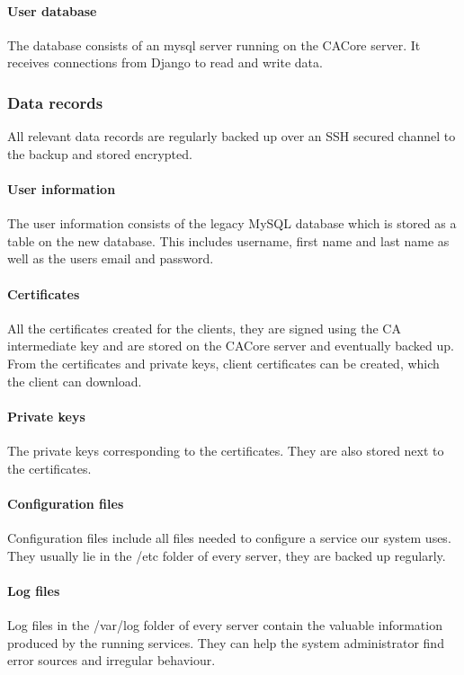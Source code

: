 \documentclass[english]{article}
\begin{document}
\paragraph{User database}
The database consists of an mysql server running on the CACore server. It receives connections from Django to read and write data.

\subsubsection{Data records}

All relevant data records are regularly backed up over an SSH secured channel to the backup and stored encrypted.

\paragraph{User information}
The user information consists of the legacy MySQL database which is stored as a table on the new database. This includes username, first name and last name as well as the users email and password.

\paragraph{Certificates}
All the certificates created for the clients, they are signed using the CA intermediate key and are stored on the CACore server and eventually backed up. From the certificates and private keys, client certificates can be created, which the client can download.


\paragraph{Private keys}
The private keys corresponding to the certificates. They are also stored next to the certificates.

\paragraph{Configuration files}
Configuration files include all files needed to configure a service our system uses. They usually lie in the /etc folder of every server, they are backed up regularly.

\paragraph{Log files}
Log files in the /var/log folder of every server contain the valuable information produced by the running services. They can help the system administrator find error sources and irregular behaviour.
\end{document}
